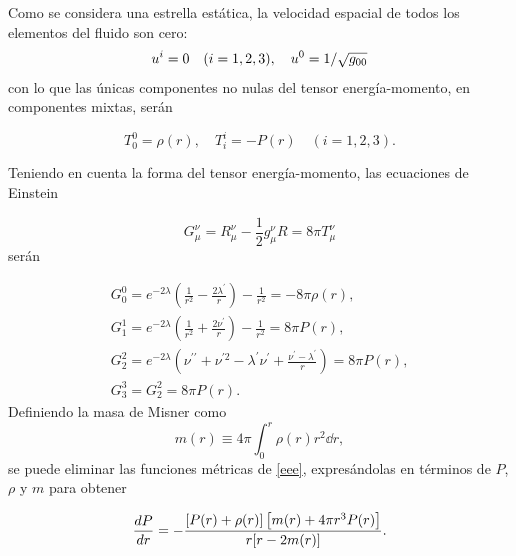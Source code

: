 Como se considera una estrella estática, la velocidad espacial de todos los elementos del fluido son cero:
\begin{equation}
    u^{i}=0 \quad (i=1,2,3)\qc u ^ { 0 } = 1 / \sqrt { g _ { 00 } }
\end{equation}
con lo que las únicas componentes no nulas del tensor energía-momento, en componentes mixtas, serán

\begin{equation}
T _ { 0 } ^ { 0 } = \rho(r) , \quad T _ { i } ^ { i } = - P(r) \quad ( i=1,2,3 ).  
\end{equation}

Teniendo en cuenta la forma del tensor energía-momento, las ecuaciones de Einstein

\begin{equation}
    G _ { \mu } ^ { \nu } = R _ { \mu } ^ { \nu } - \frac { 1 } { 2 } g _ { \mu } ^ { \nu } R = 8 \pi T _ { \mu } ^ { \nu }
\end{equation}
serán

\begin{equation}
    \begin{array} { l } { G _ { 0 } ^ { 0 } = e ^ { - 2 \lambda } \left( \frac { 1 } { r ^ { 2 } } - \frac { 2 \lambda ^ { \prime } } { r } \right) - \frac { 1 } { r ^ { 2 } } = - 8 \pi  \rho ( r ) }, \\ { G _ { 1 } ^ { 1 } = e ^ { - 2 \lambda } \left( \frac { 1 } { r ^ { 2 } } + \frac { 2 \nu ^ { \prime } } { r } \right) - \frac { 1 } { r ^ { 2 } } = 8 \pi  P ( r ) }, \\ { G _ { 2 } ^ { 2 } = e ^ { - 2 \lambda } \left( \nu ^ { \prime \prime } + \nu ^ { \prime 2 } - \lambda ^ { \prime } \nu ^ { \prime } + \frac { \nu ^ { \prime } - \lambda ^ { \prime } } { r } \right) = 8 \pi  P ( r ) }, \\ { G _ { 3 } ^ { 3 } = G _ { 2 } ^ { 2 } = 8 \pi  P ( r ) }. \end{array}
    \label{eee}
\end{equation}
Definiendo la masa de Misner como
\begin{equation}
    m ( r ) \equiv 4 \pi \int _ { 0 } ^ { r } \rho ( r ) r ^ { 2 } \dd{r},
    \label{me}
\end{equation}
se puede eliminar las funciones métricas de \eqref{eee}, expresándolas en términos de $P$, $\rho$ y $m$ para obtener 

\begin{equation}
    \dv{P}{r} = - \frac { [ P ( r ) + \rho ( r ) ] \left[ m ( r ) + 4 \pi r ^ { 3 } P ( r ) \right] } { r [ r - 2 m ( r ) ] }.
    \label{dptov}
\end{equation}

